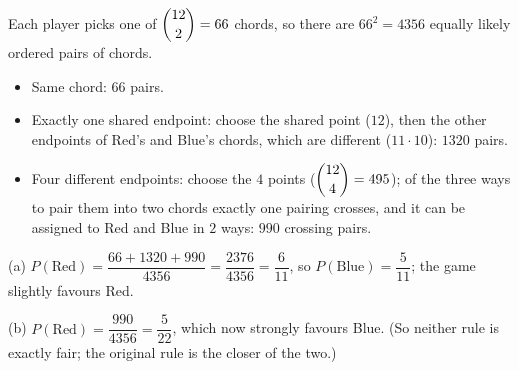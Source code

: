 Each player picks one of $\dbinom{12}{2}=66$ chords, so there are $66^2=4356$ equally likely ordered pairs of chords.
\begin{itemize}
\item Same chord: $66$ pairs.
\item Exactly one shared endpoint: choose the shared point ($12$), then the other endpoints of Red's and Blue's chords, which are different ($11\cdot10$): $1320$ pairs.
\item Four different endpoints: choose the $4$ points ($\dbinom{12}{4}=495$); of the three ways to pair them into two chords exactly one pairing crosses, and it can be assigned to Red and Blue in $2$ ways: $990$ crossing pairs.
\end{itemize}
(a) $P(\text{Red})=\dfrac{66+1320+990}{4356}=\dfrac{2376}{4356}=\boxed{\dfrac{6}{11}}$, so $P(\text{Blue})=\dfrac{5}{11}$; the game slightly favours Red.

(b) $P(\text{Red})=\dfrac{990}{4356}=\boxed{\dfrac{5}{22}}$, which now strongly favours Blue. (So neither rule is exactly fair; the original rule is the closer of the two.)
